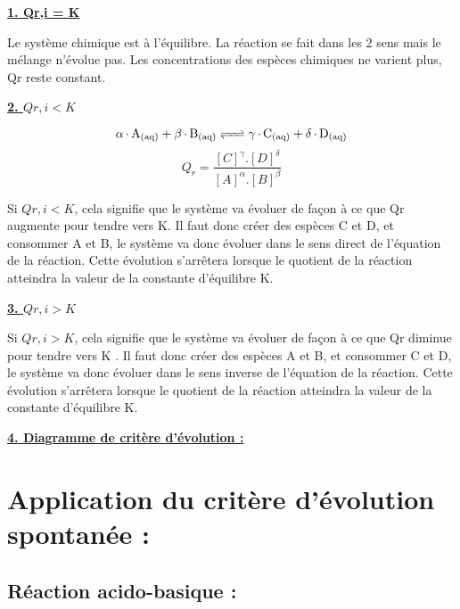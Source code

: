 \documentclass[12pt]{article}
\begin{document}
\textbf{\underline{1. Qr,i = K}}

Le système chimique est à l'équilibre. La réaction se fait dans les 2 sens mais le mélange n'évolue
pas. Les concentrations des espèces chimiques ne varient plus, Qr reste constant.

\textbf{\underline{2. $Qr,i < K$}}

$$\ce{\alpha.A_{(aq)} + \beta.B_{(aq)} <=> \gamma.C_{(aq)} + \delta.D_{(aq)}}$$
$$Q_r = \frac{[C]^{\gamma}.[D]^{\delta}}{[A]^{\alpha}.[B]^{\beta}}$$

Si $Qr,i < K$, cela signifie que le système va évoluer de façon à ce que Qr augmente pour tendre vers K.
Il faut donc créer des espèces C et D, et consommer A et B, le système va donc évoluer dans le sens
direct de l'équation de la réaction.
Cette évolution s'arrêtera lorsque le quotient de la réaction atteindra la valeur de la constante
d'équilibre K.

\textbf{\underline{3. $Qr,i > K$}}

Si $Qr,i > K$, cela signifie que le système va évoluer de façon à ce que Qr diminue pour tendre vers K .
Il faut donc créer des espèces A et B, et consommer C et D, le système va donc évoluer dans le sens
inverse de l'équation de la réaction. Cette évolution s'arrêtera lorsque le quotient de la réaction
atteindra la valeur de la constante d'équilibre K.

\textbf{\underline{4. Diagramme de critère d'évolution :}}
\begin{center}
\end{center}


\section{Application du critère d'évolution spontanée : }
\subsection{Réaction acido-basique :}
\end{document}

